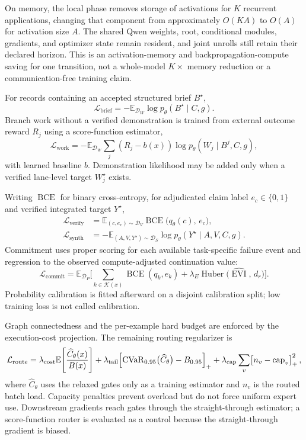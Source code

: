 \documentclass[10pt,a4paper]{article}
\newcommand{\op}[1]{\operatorname{#1}}
\newcommand{\Lcal}{\mathcal{L}}
\newcommand{\Dcal}{\mathcal{D}}
\newcommand{\Kcal}{\mathcal{K}}
\newcommand{\E}{\mathbb{E}}
\begin{document}
On memory, the local phase removes storage of activations for $K$ recurrent
applications, changing that component from approximately $O(KA)$ to $O(A)$ for
activation size $A$. The shared Qwen weights, root, conditional modules,
gradients, and optimizer state remain resident, and joint unrolls still retain
their declared horizon. This is an activation-memory and
backpropagation-compute saving for one transition, not a whole-model
$K\times$ memory reduction or a communication-free training claim.

For records containing an accepted structured brief $B^\star$,
\begin{equation}
\Lcal_{\mathrm{brief}} = -\E_{\Dcal_W} \log p_\theta( B^\star \mid C, g ).
\end{equation}
Branch work without a verified demonstration is trained from external outcome
reward $R_j$ using a score-function estimator,
\begin{equation}
\Lcal_{\mathrm{work}} = -\E_{\Dcal_W} \sum_j ( R_j - b(x) )
  \log p_\theta( W_j \mid B^j, C, g ),
\end{equation}
with learned baseline $b$. Demonstration likelihood may be added only when a
verified lane-level target $W^\star_j$ exists.

Writing $\op{BCE}$ for binary cross-entropy, for adjudicated claim label
$e_c \in \{0,1\}$ and verified integrated target $Y^\star$,
\begin{align}
\Lcal_{\mathrm{verify}} &= \E_{(c,e_c) \sim \Dcal_V}
  \op{BCE}\bigl( q_\theta(c),\, e_c \bigr), \\
\Lcal_{\mathrm{synth}} &= -\E_{(A,V,Y^\star) \sim \Dcal_S}
  \log p_\theta( Y^\star \mid A, V, C, g ).
\end{align}
Commitment uses proper scoring for each available task-specific failure event
and regression to the observed compute-adjusted continuation value:
\begin{equation}
\Lcal_{\mathrm{commit}} = \E_{\Dcal_P} \Biggl[
\sum_{k \in \Kcal(x)} \op{BCE}( q_k, e_k )
+ \lambda_E \op{Huber}\bigl( \widehat{\op{EVI}},\, d_r \bigr) \Biggr].
\end{equation}
Probability calibration is fitted afterward on a disjoint calibration split;
low training loss is not called calibration.

Graph connectedness and the per-example hard budget are enforced by the
execution-cost projection. The remaining routing regularizer is
\begin{equation}
\Lcal_{\mathrm{route}} = \lambda_{\mathrm{cost}}
  \E\Biggl[ \frac{\widehat{C}_\theta(x)}{B(x)} \Biggr]
+ \lambda_{\mathrm{tail}} \Bigl[ \op{CVaR}_{0.95}\bigl( \widehat{C}_\theta \bigr)
  - B_{0.95} \Bigr]_+
+ \lambda_{\mathrm{cap}} \sum_{v} \bigl[ n_v - \op{cap}_v \bigr]^2_+ \,,
\end{equation}
where $\widehat{C}_\theta$ uses the relaxed gates only as a training estimator
and $n_v$ is the routed batch load. Capacity penalties prevent overload but do
not force uniform expert use. Downstream gradients reach gates through the
straight-through estimator; a score-function router is evaluated as a control
because the straight-through gradient is biased.
\end{document}
